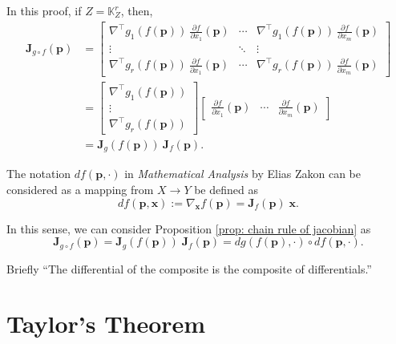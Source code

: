 \documentclass{article}
\begin{document}
\begin{note}
	In this proof, if $Z = \mathbb K_Z^r$, then,
	$$
	\begin{aligned}
	\mathbf J_{g \circ f} (\mathbf p) &=
	\left[
	\begin{matrix}
		\displaystyle \nabla^\top g_1(f(\mathbf p)) \ \frac{\partial f}{\partial x_1}(\mathbf p) & \cdots & \displaystyle \nabla^\top g_1(f(\mathbf p)) \ \frac{\partial f}{\partial x_m}(\mathbf p) \\
		\vdots & \ddots & \vdots \\
		\displaystyle \nabla^\top g_r(f(\mathbf p)) \ \frac{\partial f}{\partial x_1}(\mathbf p) & \cdots & \displaystyle \nabla^\top g_r(f(\mathbf p)) \ \frac{\partial f}{\partial x_m}(\mathbf p)
	\end{matrix}
	\right] \\
	&=
	\left[
	\begin{matrix}
		\nabla^\top g_1 (f(\mathbf p)) \\
		\vdots \\
		\nabla^\top g_r (f(\mathbf p))
	\end{matrix}
	\right]
	\left[
	\begin{matrix}
		\displaystyle\frac{\partial f}{\partial x_1} (\mathbf p) & \cdots & \displaystyle \frac{\partial f}{\partial x_m} (\mathbf p)
	\end{matrix}
	\right] \\
	&= \mathbf J_{g} (f(\mathbf p)) \ \mathbf J_f (\mathbf p).
	\end{aligned}
	$$
\end{note}


\begin{note}
	The notation $df(\mathbf p, \cdot)$ in \textit{Mathematical Analysis} by Elias Zakon can be considered as a mapping from $X \to Y$ be defined as
	$$
	df(\mathbf p, \mathbf x) := \nabla_{\mathbf x} f(\mathbf p) = \mathbf J_f(\mathbf p) \; \mathbf x.
	$$
	
	In this sense, we can consider Proposition \ref{prop: chain rule of jacobian} as
	$$
	\mathbf J_{g \circ f}(\mathbf p) = \mathbf J_{g}(f(\mathbf p)) \; \mathbf J_{f}(\mathbf p) = dg(f(\mathbf p), \cdot ) \circ df(\mathbf p, \cdot).
	$$
	
	Briefly ``The differential of the composite is the composite of differentials.''
\end{note}



\section{Taylor's Theorem}
\end{document}
